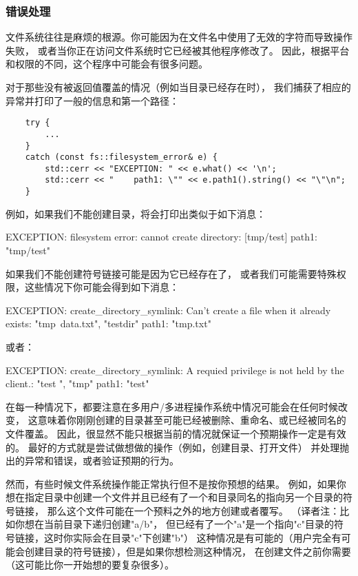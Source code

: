 \subsubsection{错误处理}\label{ch20.1.3.6}
文件系统往往是麻烦的根源。你可能因为在文件名中使用了无效的字符而导致操作失败，
或者当你正在访问文件系统时它已经被其他程序修改了。
因此，根据平台和权限的不同，这个程序中可能会有很多问题。

对于那些没有被返回值覆盖的情况（例如当目录已经存在时），
我们捕获了相应的异常并打印了一般的信息和第一个路径：
\begin{lstlisting}
    try {
        ...
    }
    catch (const fs::filesystem_error& e) {
        std::cerr << "EXCEPTION: " << e.what() << '\n';
        std::cerr << "    path1: \"" << e.path1().string() << "\"\n";
    }
\end{lstlisting}
例如，如果我们不能创建目录，将会打印出类似于如下消息：
\begin{blacklisting}
    EXCEPTION: filesystem error: cannot create directory: [tmp/test]
        path1: "tmp/test"
\end{blacklisting}
如果我们不能创建符号链接可能是因为它已经存在了，
或者我们可能需要特殊权限，这些情况下你可能会得到如下消息：\label{创建链接失败}
\begin{blacklisting}
    EXCEPTION: create_directory_symlink: Can't create a file when it
                                         already exists: "tmp\test{}.txt", "testdir"
        path1: "tmp\test\data.txt"
\end{blacklisting}
或者：
\begin{blacklisting}
    EXCEPTION: create_directory_symlink: A requied privilege is not
                                         held by the client.: "test
                                         ", "tmp\slink"
        path1: "test"
\end{blacklisting}
在每一种情况下，都要注意在多用户/多进程操作系统中情况可能会在任何时候改变，
这意味着你刚刚创建的目录甚至可能已经被删除、重命名、或已经被同名的文件覆盖。
因此，很显然不能只根据当前的情况就保证一个预期操作一定是有效的。
最好的方式就是尝试做想做的操作（例如，创建目录、打开文件）
并处理抛出的异常和错误，或者验证预期的行为。

然而，有些时候文件系统操作能正常执行但不是按你预想的结果。
例如，如果你想在指定目录中创建一个文件并且已经有了一个和目录同名的指向另一个目录的符号链接，
那么这个文件可能在一个预料之外的地方创建或者覆写。
（译者注：比如你想在当前目录下递归创建"a/b"，
但已经有了一个"a"是一个指向"c"目录的符号链接，这时你实际会在目录"c"下创建"b"）
这种情况是有可能的（用户完全有可能会创建目录的符号链接），但是如果你想检测这种情况，
在创建文件之前你需要（这可能比你一开始想的要复杂很多）。

